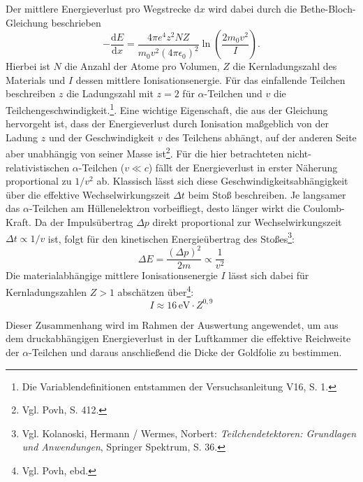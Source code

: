 Der mittlere Energieverlust pro Wegstrecke $\mathrm{d}x$ wird dabei durch die Bethe-Bloch-Gleichung beschrieben
\begin{equation}
    -\frac{\mathrm{d}E}{\mathrm{d}x} = \frac{4\pi e^4 z^2 N Z}{m_0 v^2 (4\pi\epsilon_0)^2} \ln \left( \frac{2 m_0 v^2}{I} \right).
\end{equation}
Hierbei ist $N$ die Anzahl der Atome pro Volumen, $Z$ die Kernladungszahl des Materials und $I$ dessen mittlere Ionisationsenergie. Für das einfallende Teilchen beschreiben $z$ die Ladungszahl mit $z=2$ für $\alpha$-Teilchen und $v$ die Teilchengeschwindigkeit.\footnote{Die Variablendefinitionen entstammen der Versuchsanleitung V16, S. 1.}.
Eine wichtige Eigenschaft, die aus der Gleichung hervorgeht ist, dass der Energieverlust durch Ionisation maßgeblich von der Ladung $z$ und der Geschwindigkeit $v$ des Teilchens abhängt, auf der anderen Seite aber unabhängig von seiner Masse ist\footnote{Vgl. Povh, S. 412.}. Für die hier betrachteten nicht-relativistischen $\alpha$-Teilchen ($v \ll c$) fällt der Energieverlust in erster Näherung proportional zu $1/v^2$ ab. Klassisch lässt sich diese Geschwindigkeitsabhängigkeit über die effektive Wechselwirkungszeit $\Delta t$ beim Stoß beschreiben. Je langsamer das $\alpha$-Teilchen am Hüllenelektron vorbeifliegt, desto länger wirkt die Coulomb-Kraft. Da der Impulsübertrag $\Delta p$ direkt proportional zur Wechselwirkungszeit $\Delta t \propto 1/v$ ist, folgt für den kinetischen Energieübertrag des Stoßes\footnote{Vgl. Kolanoski, Hermann / Wermes, Norbert: \textit{Teilchendetektoren: Grundlagen und Anwendungen}, Springer Spektrum, S. 36.}:
\begin{equation}
    \Delta E = \frac{(\Delta p)^2}{2m} \propto \frac{1}{v^2}
\end{equation}
Die materialabhängige mittlere Ionisationsenergie $I$ lässt sich dabei für Kernladungszahlen $Z > 1$ abschätzen über\footnote{Vgl. Povh, ebd.}:
\begin{equation}
    I \approx 16\,\text{eV} \cdot Z^{0,9}
\end{equation}

Dieser Zusammenhang wird im Rahmen der Auswertung angewendet, um aus dem druckabhängigen Energieverlust in der Luftkammer die effektive Reichweite der $\alpha$-Teilchen und daraus anschließend die Dicke der Goldfolie zu bestimmen.

